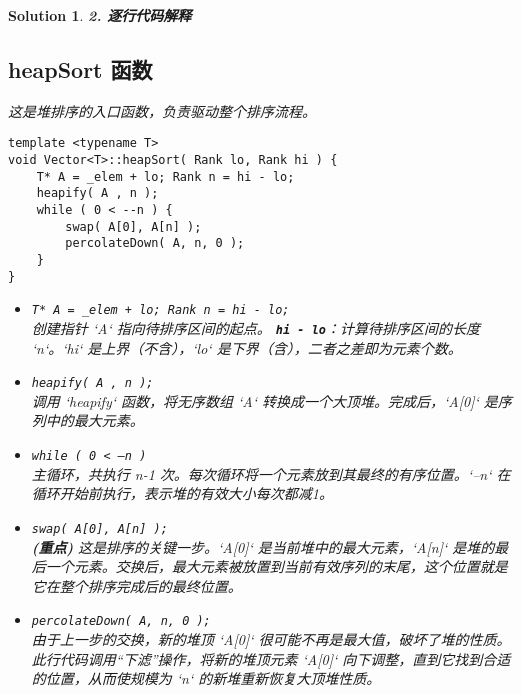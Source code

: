 \documentclass[UTF8]{report}
\newtheorem{solution}{Solution}
\theoremstyle{MyLineTheoremStyle} %
\theoremstyle{MyBlockTheoremStyle} %
\theoremstyle{MySubsubsectionStyle} %
\begin{document}
\begin{enumerate}
\begin{solution}
    \vspace{1em}
    \textbf{2. 逐行代码解释}

    \subsection*{heapSort 函数}
    这是堆排序的入口函数，负责驱动整个排序流程。
    \begin{lstlisting}[style=cppstyle]
template <typename T> 
void Vector<T>::heapSort( Rank lo, Rank hi ) {
    T* A = _elem + lo; Rank n = hi - lo; 
    heapify( A , n );
    while ( 0 < --n ) { 
        swap( A[0], A[n] ); 
        percolateDown( A, n, 0 ); 
    }
}
    \end{lstlisting}
    \begin{itemize}
        \item \texttt{T* A = \_elem + lo; Rank n = hi - lo;} \\
        创建指针 `A` 指向待排序区间的起点。
        \textbf{\texttt{hi - lo}}：计算待排序区间的长度 `n`。`hi` 是上界（不含），`lo` 是下界（含），二者之差即为元素个数。
        
        \item \texttt{heapify( A , n );} \\
        调用 `heapify` 函数，将无序数组 `A` 转换成一个大顶堆。完成后，`A[0]` 是序列中的最大元素。
        
        \item \texttt{while ( 0 < --n )} \\
        主循环，共执行 n-1 次。每次循环将一个元素放到其最终的有序位置。`--n` 在循环开始前执行，表示堆的有效大小每次都减1。
        
        \item \texttt{swap( A[0], A[n] );} \\
        \textbf{(重点)} 这是排序的关键一步。`A[0]` 是当前堆中的最大元素，`A[n]` 是堆的最后一个元素。交换后，最大元素被放置到当前有效序列的末尾，这个位置就是它在整个排序完成后的最终位置。
        
        \item \texttt{percolateDown( A, n, 0 );} \\
        由于上一步的交换，新的堆顶 `A[0]` 很可能不再是最大值，破坏了堆的性质。此行代码调用“下滤”操作，将新的堆顶元素 `A[0]` 向下调整，直到它找到合适的位置，从而使规模为 `n` 的新堆重新恢复大顶堆性质。
    \end{itemize}


\end{solution}
\end{enumerate}
\end{document}
